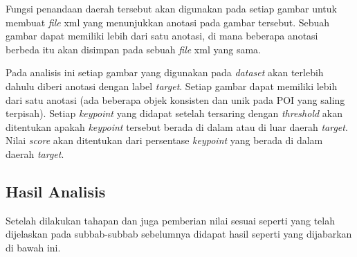 Fungsi penandaan daerah tersebut akan digunakan pada setiap gambar untuk membuat \textit{file} xml yang menunjukkan anotasi pada gambar tersebut. Sebuah gambar dapat memiliki lebih dari satu anotasi, di mana beberapa anotasi berbeda itu akan disimpan pada sebuah \textit{file} xml yang sama. 

Pada analisis ini setiap gambar yang digunakan pada \textit{dataset} akan terlebih dahulu diberi anotasi dengan label \textit{target}. Setiap gambar dapat memiliki lebih dari satu anotasi (ada beberapa objek konsisten dan unik pada POI yang saling terpisah). Setiap \textit{keypoint} yang didapat setelah tersaring dengan \textit{threshold} akan ditentukan apakah \textit{keypoint} tersebut berada di dalam atau di luar daerah \textit{target}. Nilai \textit{score} akan ditentukan dari persentase \textit{keypoint} yang berada di dalam daerah \textit{target}.

\subsection{Hasil Analisis}
Setelah dilakukan tahapan dan juga pemberian nilai sesuai seperti yang telah dijelaskan pada subbab-subbab sebelumnya didapat hasil seperti yang dijabarkan di bawah ini.

